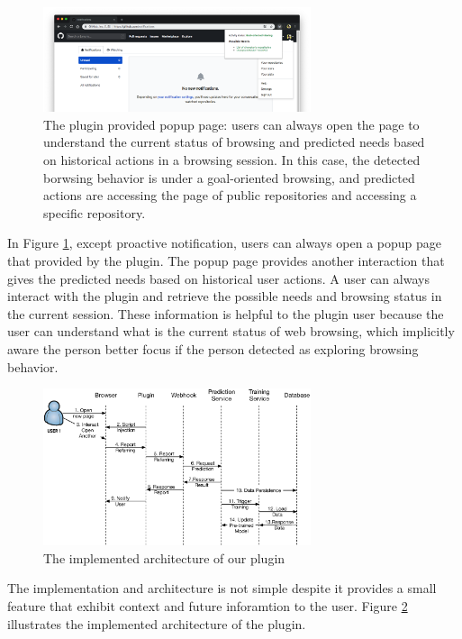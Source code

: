 \begin{figure}[H]
    \centering
    \includegraphics[width=0.7\textwidth]{figures/plugin-predicting-result}
    \caption{The plugin provided popup page: users can always open the page
    to understand the current status of browsing and predicted needs based on
    historical actions in a browsing session. In this case, the detected borwsing behavior
    is under a goal-oriented browsing, and predicted actions
    are accessing the page of public repositories and accessing a specific repository.}
    \label{fig:plugin-predict}
\end{figure}

In Figure \ref{fig:plugin-predict}, except proactive notification, 
users can always open a popup page that provided by the plugin.
The popup page provides another interaction that gives the predicted needs 
based on historical user actions. A user can always interact with the plugin and
retrieve the possible needs and browsing status in the current session.
These information is helpful to the plugin user because the user can understand
what is the current status of web browsing, which implicitly aware the person better focus
if the person detected as exploring browsing behavior.

\begin{figure}[H]
    \centering
    \includegraphics[width=0.7\textwidth]{figures/arch}
    \caption{The implemented architecture of our plugin}
    \label{fig:arch}
\end{figure}

The implementation and architecture is not simple
despite it provides a small feature that exhibit context and future inforamtion to the user.
Figure \ref{fig:arch} illustrates the implemented architecture of the plugin.

